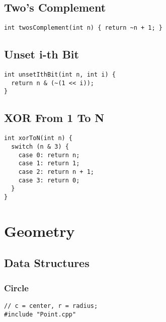 \documentclass[twoside]{article}
\begin{document}
\begin{multicols*}{2}
\subsection*{Two's Complement}
\begin{verbatim}
int twosComplement(int n) { return ~n + 1; }
\end{verbatim}

\subsectionfont{\large\bfseries\sffamily\underline}
\subsection*{Unset i-th Bit}
\begin{verbatim}
int unsetIthBit(int n, int i) {
  return n & (~(1 << i));
}
\end{verbatim}

\subsectionfont{\large\bfseries\sffamily\underline}
\subsection*{XOR From 1 To N}
\begin{verbatim}
int xorToN(int n) {
  switch (n & 3) {
    case 0: return n;
    case 1: return 1;
    case 2: return n + 1;
    case 3: return 0;
  }
}
\end{verbatim}

\sectionfont{\bfseries\sffamily\centering\Huge}
\vspace{1em}
\section*{Geometry}
\vspace{3em}
\subsectionfont{\bfseries\sffamily\centering\LARGE}
\vspace{0em}
\subsection*{Data Structures}
\vspace{2em}
\subsubsectionfont{\large\bfseries\sffamily\underline}
\subsubsection*{Circle}
\begin{verbatim}
// c = center, r = radius;
#include "Point.cpp"


\end{verbatim}
\end{multicols*}
\end{document}
